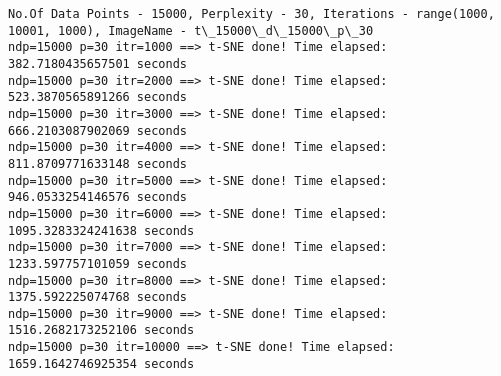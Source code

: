\documentclass[11pt]{article}
\begin{document}
    \begin{Verbatim}[commandchars=\\\{\}]
No.Of Data Points - 15000, Perplexity - 30, Iterations - range(1000, 10001, 1000), ImageName - t\_15000\_d\_15000\_p\_30
ndp=15000 p=30 itr=1000 ==> t-SNE done! Time elapsed: 382.7180435657501 seconds
ndp=15000 p=30 itr=2000 ==> t-SNE done! Time elapsed: 523.3870565891266 seconds
ndp=15000 p=30 itr=3000 ==> t-SNE done! Time elapsed: 666.2103087902069 seconds
ndp=15000 p=30 itr=4000 ==> t-SNE done! Time elapsed: 811.8709771633148 seconds
ndp=15000 p=30 itr=5000 ==> t-SNE done! Time elapsed: 946.0533254146576 seconds
ndp=15000 p=30 itr=6000 ==> t-SNE done! Time elapsed: 1095.3283324241638 seconds
ndp=15000 p=30 itr=7000 ==> t-SNE done! Time elapsed: 1233.597757101059 seconds
ndp=15000 p=30 itr=8000 ==> t-SNE done! Time elapsed: 1375.592225074768 seconds
ndp=15000 p=30 itr=9000 ==> t-SNE done! Time elapsed: 1516.2682173252106 seconds
ndp=15000 p=30 itr=10000 ==> t-SNE done! Time elapsed: 1659.1642746925354 seconds

    \end{Verbatim}

    \begin{center}
    \end{center}
    { \hspace*{\fill} \\}
    
    \begin{center}
    \end{center}
    { \hspace*{\fill} \\}
    
    \begin{center}
    \end{center}
    { \hspace*{\fill} \\}
    
    \begin{center}
    \end{center}
    { \hspace*{\fill} \\}
    
    \begin{center}
    \end{center}
    { \hspace*{\fill} \\}
    
\end{document}
